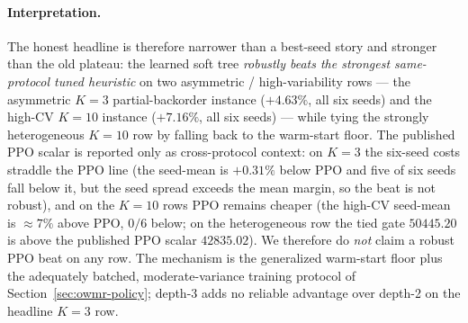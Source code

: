 \documentclass[11pt]{article}
\begin{document}
\paragraph{Interpretation.}
The honest headline is therefore narrower than a best-seed story and stronger than the old plateau:
the learned soft tree \emph{robustly beats the strongest same-protocol tuned heuristic} on two
asymmetric / high-variability rows --- the asymmetric $K{=}3$ partial-backorder instance
($+4.63\%$, all six seeds) and the high-CV $K{=}10$ instance ($+7.16\%$, all six seeds) --- while tying
the strongly heterogeneous $K{=}10$ row by falling back to the warm-start floor. The published PPO scalar
is reported only as cross-protocol context: on $K{=}3$ the six-seed costs straddle the PPO line (the
seed-mean is $+0.31\%$ below PPO and five of six seeds fall below it, but the seed spread exceeds the
mean margin, so the beat is not robust), and on the $K{=}10$ rows PPO remains cheaper (the high-CV
seed-mean is $\approx 7\%$ above PPO, $0/6$ below; on the heterogeneous row the tied gate $50445.20$
is above the published PPO scalar $42835.02$). We therefore do \emph{not} claim a robust PPO beat on
any row. The mechanism is the generalized warm-start floor plus the adequately batched, moderate-variance
training protocol of Section~\ref{sec:owmr-policy}; depth-3 adds no reliable advantage over depth-2 on
the headline $K{=}3$ row.
\end{document}
